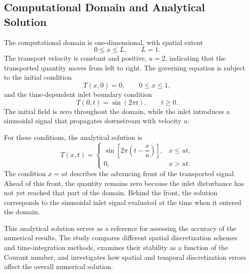 \subsection{Computational Domain and Analytical Solution}
\label{subsec:domain_analytical_solution}

The computational domain is one-dimensional, with spatial extent
\begin{equation}
    0 \leq x \leq L, \qquad L=1.
    \label{eq:domain}
\end{equation}
The transport velocity is constant and positive, $u=2$, indicating that the transported quantity moves from left to right. The governing equation is subject to the initial condition
\begin{equation}
    T(x,0)=0, \qquad 0\leq x\leq 1,
    \label{eq:initial_condition}
\end{equation}
and the time-dependent inlet boundary condition
\begin{equation}
    T(0,t)=\sin(2\pi t), \qquad t\geq 0.
    \label{eq:inlet_boundary_condition}
\end{equation}
The initial field is zero throughout the domain, while the inlet introduces a sinusoidal signal that propagates downstream with velocity $u$.

For these conditions, the analytical solution is
\begin{equation}
    T(x,t)=
    \begin{cases}
        \sin\!\left[2\pi\left(t-\dfrac{x}{u}\right)\right],
        & x\leq ut,\\[6pt]
        0, & x>ut.
    \end{cases}
    \label{eq:analytical_solution}
\end{equation}
The condition $x=ut$ describes the advancing front of the transported signal. Ahead of this front, the quantity remains zero because the inlet disturbance has not yet reached that part of the domain. Behind the front, the solution corresponds to the sinusoidal inlet signal evaluated at the time when it entered the domain.

This analytical solution serves as a reference for assessing the accuracy of the numerical results. The study compares different spatial discretization schemes and time-integration methods, examines their stability as a function of the Courant number, and investigates how spatial and temporal discretization errors affect the overall numerical solution.
